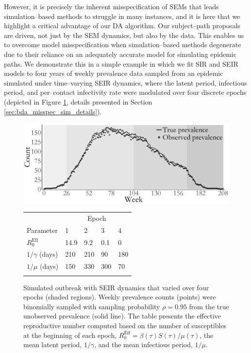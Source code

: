 However, it is precisely the inherent misspecification of SEMs that leads simulation--based methods to struggle in many instances, and it is here that we highlight a critical advantage of our DA algorithm. Our subject--path proposals are driven, not just by the SEM dynamics, but also by the data. This enables us to overcome model misspecification when simulation--based methods degenerate due to their reliance on an adequately accurate model for simulating epidemic paths. We demonstrate this in a simple example in which we fit SIR and SEIR models to four years of weekly prevalence data sampled from an epidemic simulated under time--varying SEIR dynamics, where the latent period, infectious period, and per--contact infectivity rate were modulated over four discrete epochs (depicted in Figure \ref{fig:misspec_data}, details presented in Section \ref{sec:bda_misspec_sim_details}).

\setcounter{table}{1}
\begin{figure}[!ht]
	\centering
	\includegraphics[width=0.5\linewidth]{figures/SEIR_misspec_data.pdf}
	\qquad
	\begin{tabular}[b]{lllll}
		& \multicolumn{4}{c}{Epoch}\\ \cmidrule{2-5}
		Parameter & 1 & 2 & 3 & 4 \\ \hline	
		$ R_0^{\mathrm{Eff}} $ & 14.9& 9.2& 0.1& 0\\
		$ 1/\gamma $ (days) & 210&210&90& 180\\
		$ 1/\mu $ (days) & 150 &330&300&70	\\
		&&&&
	\end{tabular}
	\captionsetup{labelformat=andtable}
	\caption[Simulated outbreak data from an SEIR model with time--varying dynamics.]{Simulated outbreak with SEIR dynamics that varied over four epochs (shaded regions). Weekly prevalence counts (points) were binomially sampled with sampling probability $ \rho = 0.95 $ from the true unobserved prevalence (solid line). The table presents the effective reproductive number computed based on the number of susceptibles at the beginning of each epoch, $ R_0^{\mathrm{Eff}} = \beta(\tau) S(\tau) / \mu(\tau) $, the mean latent period, $ 1/\gamma $, and the mean infectious period, $ 1/\mu $.}
	\label{fig:misspec_data}
\end{figure}

